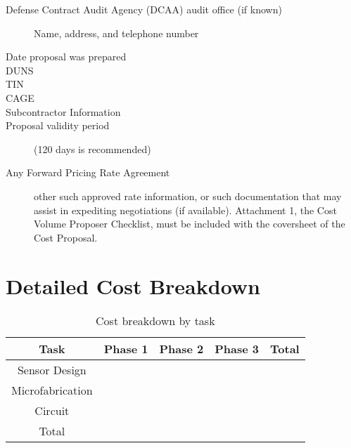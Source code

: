\begin{description}
\item [Defense Contract Audit Agency (DCAA) audit office (if known)] Name, address, and telephone number
\item [Date proposal was prepared]
\item [DUNS]
\item [TIN]
\item [CAGE]
\item [Subcontractor Information]
\item [Proposal validity period] (120 days is recommended)
\item [Any Forward Pricing Rate Agreement] other such approved rate information, or such documentation that may assist in expediting negotiations (if available).
Attachment 1, the Cost Volume Proposer Checklist, must be included with the coversheet
of the Cost Proposal.
\end{description}

\section{Detailed Cost Breakdown}
\begin{table}[h!]
  \centering
  \begin{tabular}{|c||c|c|c|c|}
    \hline
    Task & Phase 1 & Phase 2 & Phase 3 & Total\\
    \hline
    \hline
    Sensor Design & & & & \\
    \hline
    Microfabrication & & & & \\
    \hline
    Circuit & & & & \\
    \hline
    Total & & & & \\
    \hline
  \end{tabular}
  \caption{Cost breakdown by task}
  \label{tab:taskcost}
\end{table}

